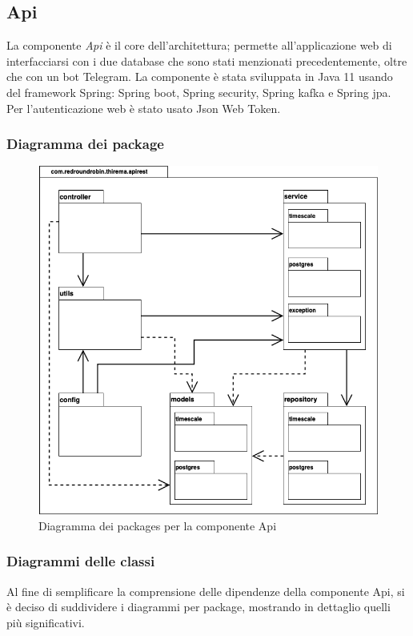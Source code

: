 \subsection{Api}
	La componente \textit{Api} è il core dell'architettura; permette all'applicazione web di interfacciarsi con i due database che sono stati menzionati precedentemente, oltre che con un bot Telegram.
	La componente è stata sviluppata in Java 11 usando del framework Spring: Spring boot, Spring security, Spring kafka e Spring jpa. Per l'autenticazione web è stato usato Json Web Token.

	\subsubsection{Diagramma dei package}%
		\begin{figure}[H]
			\centering
			\includegraphics[scale=0.500]{res/images/API/packageAPI.png}
			\caption{Diagramma dei packages per la componente Api}
			\label{Diagramma 10}
		\end{figure}

	\subsubsection{Diagrammi delle classi}
		Al fine di semplificare la comprensione delle dipendenze della componente Api, si è deciso di suddividere i diagrammi per package, mostrando in dettaglio quelli più significativi.


